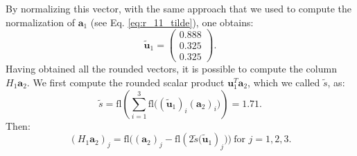 \documentclass[a4paper,11pt]{article}
\begin{document}
%
By normalizing this vector, with the same approach that we used to compute the normalization of $\textbf{a}_{1}$ (see Eq. \eqref{eq:r_11_tilde}), one obtains:
\begin{equation}
	\tilde{\textbf{u}}_{1} = 
	\begin{pmatrix}
		0.888\\
		0.325\\
		0.325
	\end{pmatrix}.
\end{equation}
Having obtained all the rounded vectors, it is possible to compute the column $H_1 \textbf{a}_2$. We first compute the rounded scalar product $\textbf{u}_1^T\textbf{a}_2$, which we called $\tilde{s}$, as:
\begin{equation}
	\tilde{s} = \text{fl}\left( \sum_{i=1}^{3} \text{fl}\Big( (\tilde{\textbf{u}}_{1})_{i} (\textbf{a}_{2})_{i}\Big) \right) = 1.71.
\end{equation}
Then:
\begin{equation}
	(H_1 \textbf{a}_2)_{j} = \text{fl} \Big((\textbf{a}_{2})_{j} - \text{fl}(2\tilde{s} \big(\tilde{\textbf{u}}_{1})_{j}\big)\Big) \ \text{for } j = 1,2,3.
\end{equation}
\end{document}
